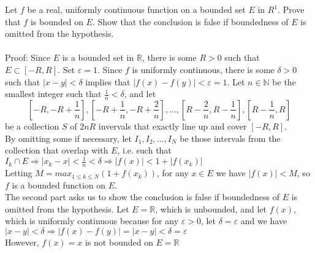 \documentclass [12pt,letterpaper]{exam}
\begin{document}
\begin{questions}
\question Let $f$ be a real, uniformly continuous function on a
bounded set $E$ in $R^1$. Prove that $f$ is bounded on $E$. Show
that the conclusion is false if boundedness of $E$ is omitted from
the hypothesis.\\\\
Proof: Since $E$ is a bounded set in $\mathbb{R}$, there is some $R > 0$ such that $E \subset [-R,R].$ Set $\varepsilon = 1$. Since $f$ is uniformly continuous, there is some $\delta > 0$ such that $|x - y| < \delta$ implies that $|f(x) - f(y)| < \varepsilon = 1$. Let $n \in \mathbb{N}$ be the smallest integer such that ${\frac{1}{n} < \delta}$, and let $$[-R,-R+\frac{1}{n}], [-R+\frac{1}{n},-R+\frac{2}{n}],...,[R-\frac{2}{n},R-\frac{1}{n}],[R-\frac{1}{n},R]$$
be a collection $S$ of $2nR$ invervals that exactly line up and cover $[-R,R]$. \\
By omitting some if necessary, let $I_1, I_2,..., I_N$ be those intervals from the collection that overlap with $E$, i.e. such that $I_k \cap E \Rightarrow |x_k - x| < \frac{1}{n} < \delta \Rightarrow |f(x)| < 1 + |f(x_k)|$ \\
Letting $M = max_{1 \leq k \leq N}(1 + f(x_k))$, for any $x \in E$ we have $|f(x)| < M$, so $f$ is a bounded function on $E$.\\
The second part asks us to show the conclusion is false if boundedness of $E$ is omitted from the hypothesis. Let $E = \mathbb{R}$, which is unbounded, and let $f(x)$, which is uniformly continuous because for any $\varepsilon > 0$, let $\delta = \varepsilon$ and we have
$|x - y| < \delta \Rightarrow |f(x) - f(y)| = |x - y| < \delta = \varepsilon$ \\
However, $f(x) = x$ is not bounded on $E = \mathbb{R}$\\


\end{questions}
\end{document}
